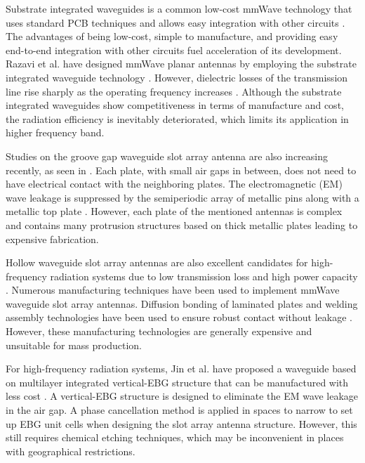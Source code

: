 \documentclass[a4paper,12pt]{report}
\begin{document}
Substrate integrated waveguides
is a common low-cost mmWave technology that uses
standard PCB techniques and allows easy integration
with other circuits
\cite[]{7296630,7918508,4814705,5439781,6990565}.
The advantages of being low-cost, simple
to manufacture,
and providing easy end-to-end integration
with other circuits fuel acceleration of its development.
Razavi et al. have
designed mmWave planar antennas by employing the
substrate integrated waveguide technology
\cite{6840353}.
However, dielectric losses of
the transmission line rise sharply as the operating frequency
increases \cite{8581479}.
Although the substrate integrated waveguides show
competitiveness in terms of manufacture and cost, the radiation
efficiency is inevitably deteriorated,
which limits its application in higher frequency band.

Studies on the groove gap waveguide slot array antenna
are also increasing recently,
as seen in \cite{8736521}.
Each plate, with small air gaps in between,
does not need to have
electrical contact with the neighboring plates.
The electromagnetic (EM)
wave leakage is suppressed by the semiperiodic array of
metallic pins along with a metallic top plate
\cite[]{5608486,6157653,7931702,8359490,8668424}.
However, each plate of the
mentioned antennas is complex and contains many
protrusion structures based on thick metallic plates leading to
expensive fabrication.

Hollow waveguide slot array antennas are also
excellent candidates for high-frequency radiation systems due to low
transmission loss and high power capacity
\cite{5784313} \cite{7762807}.
Numerous manufacturing techniques have been used to implement
mmWave waveguide slot array antennas.
Diffusion bonding of laminated
plates and welding assembly technologies have been used
to ensure robust contact without leakage
\cite{5398159} \cite{5723725}.
However,
these manufacturing technologies are generally expensive and
unsuitable for mass production.

For high-frequency radiation systems,
Jin et al. have proposed a waveguide
based on multilayer integrated vertical-EBG structure
that can be manufactured with less cost
\cite{9538996}.
A vertical-EBG structure
is designed to eliminate the EM wave leakage in the air
gap.
A phase cancellation method is applied in spaces
to narrow to set up EBG unit cells
when designing
the slot array antenna structure.
However, this still
requires chemical etching techniques,
which may be inconvenient in places with geographical restrictions.
\end{document}
